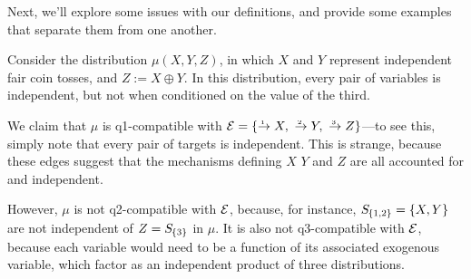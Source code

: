 \documentclass{article}
\begin{document}
Next, we'll explore some issues with our definitions, and provide some examples that separate them from one another.

\begin{example}
    Consider the distribution $\mu(X,Y,Z)$, in which $X$ and $Y$ represent independent fair coin tosses, and $Z := X \oplus Y$.
    In this distribution, every pair of variables is independent, but not when conditioned on the value of the third.
    
    We claim that $\mu$ is q1-compatible with $\Ed = \{ \ed1{}X, ~ \ed2{}Y, ~ \ed3{}Z \}$---to see this, simply note that every pair of targets is independent. This is strange, because these edges suggest that the mechanisms defining $X$ $Y$ and $Z$ are all accounted for and independent. 
    
    However, $\mu$ is not q2-compatible with $\mathcal E$, because, for instance,
    $\Src {\{1,2\}} = \{X,Y\}$ are not independent of $Z = \Src {\{3\}}$ in $\mu$.
    It is also not q3-compatible with $\mathcal E$, because each variable would need to be a function of its associated exogenous variable, which factor as an independent product of three distributions. 
\end{example}
\end{document}

